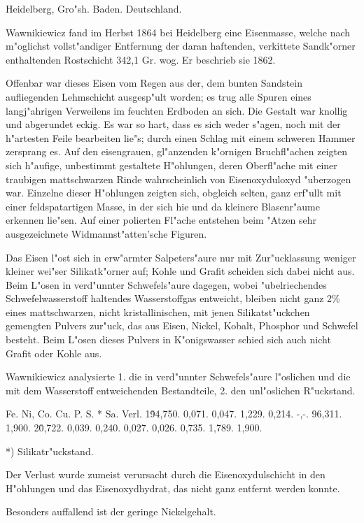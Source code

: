 \documentclass[a4paper, 11pt, oneside]{article}
\begin{document}
Heidelberg, Gro"sh. Baden. Deutschland.

Wawnikiewicz fand im Herbst 1864 bei Heidelberg eine Eisenmasse, welche nach m"oglichst vollst"andiger Entfernung der daran haftenden, verkittete Sandk"orner enthaltenden Rostschicht 342,1 Gr. wog. Er beschrieb sie 1862.

Offenbar war dieses Eisen vom Regen aus der, dem bunten Sandstein aufliegenden Lehmschicht ausgesp"ult worden; es trug alle Spuren eines langj"ahrigen Verweilens im feuchten Erdboden an sich. Die Gestalt war knollig und abgerundet eckig. Es war so hart, dass es sich weder s"agen, noch mit der h"artesten Feile bearbeiten lie"s; durch einen Schlag mit einem schweren Hammer zersprang es. Auf den eisengrauen, gl"anzenden k"ornigen Bruchfl"achen zeigten sich h"aufige, unbestimmt gestaltete H"ohlungen, deren Oberfl"ache mit einer traubigen mattschwarzen Rinde wahrscheinlich von Eisenoxyduloxyd "uberzogen war. Einzelne dieser H"ohlungen zeigten sich, obgleich selten, ganz erf"ullt mit einer feldspatartigen Masse, in der sich hie und da kleinere Blasenr"aume erkennen lie"sen. Auf einer polierten Fl"ache entstehen beim "Atzen sehr ausgezeichnete Widmannst"atten'sche Figuren.

Das Eisen l"ost sich in erw"armter Salpeters"aure nur mit Zur"ucklassung weniger kleiner wei"ser Silikatk"orner auf; Kohle und Grafit scheiden sich dabei nicht aus. Beim L"osen in verd"unnter Schwefels"aure dagegen, wobei "ubelriechendes Schwefelwasserstoff haltendes Wasserstoffgas entweicht, bleiben nicht ganz 2\% eines mattschwarzen, nicht kristallinischen, mit jenen Silikatst"uckchen gemengten Pulvers zur"uck, das aus Eisen, Nickel, Kobalt, Phosphor und Schwefel besteht. Beim L"osen dieses Pulvers in K"onigswasser schied sich auch nicht Grafit oder Kohle aus.

Wawnikiewicz analysierte 1. die in verd"unnter Schwefels"aure l"oslichen und die mit dem Wasserstoff entweichenden Bestandteile, 2. den unl"oslichen R"uckstand.

Fe. Ni, Co. Cu. P. S. * Sa. Verl.  
1\. 94,750. 0,071. 0,047. 1,229. 0,214. -,-. 96,311. 1,900.  
2\. 0,722. 0,039. 0,240. 0,027. 0,026. 0,735. 1,789. 1,900.

*) Silikatr"uckstand.

Der Verlust wurde zumeist verursacht durch die Eisenoxydulschicht in den H"ohlungen und das Eisenoxydhydrat, das nicht ganz entfernt werden konnte.

Besonders auffallend ist der geringe Nickelgehalt.
\end{document}
